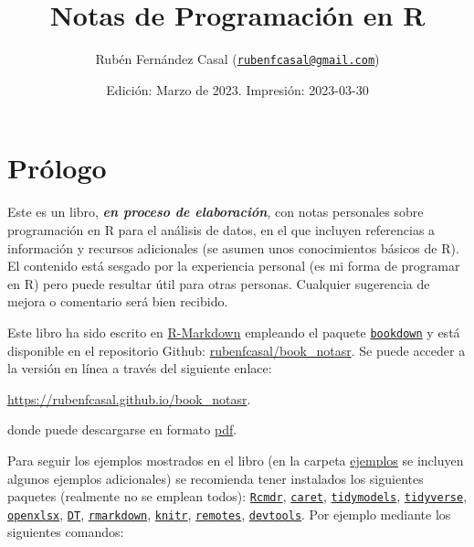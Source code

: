 \documentclass[
]{book}
\title{Notas de Programación en R}
\author{Rubén Fernández Casal (\href{mailto:rubenfcasal@gmail.com}{\nolinkurl{rubenfcasal@gmail.com}})}
\date{Edición: Marzo de 2023. Impresión: 2023-03-30}
\theoremstyle{break}
\theoremstyle{nonumberplain}
\begin{document}
\maketitle

{
\setcounter{tocdepth}{1}
\tableofcontents
}
\hypertarget{pruxf3logo}{%
\chapter*{Prólogo}\label{pruxf3logo}}

Este es un libro, \textbf{\emph{en proceso de elaboración}}, con notas personales sobre programación en R para el análisis de datos, en el que incluyen referencias a información y recursos adicionales (se asumen unos conocimientos básicos de R).
El contenido está sesgado por la experiencia personal (es mi forma de programar en R) pero puede resultar útil para otras personas.
Cualquier sugerencia de mejora o comentario será bien recibido.

Este libro ha sido escrito en \href{http://rmarkdown.rstudio.com}{R-Markdown} empleando el paquete \href{https://bookdown.org/yihui/bookdown/}{\texttt{bookdown}} y está disponible en el repositorio Github: \href{https://github.com/rubenfcasal/book_notasr}{rubenfcasal/book\_notasr}.
Se puede acceder a la versión en línea a través del siguiente enlace:

\url{https://rubenfcasal.github.io/book_notasr}.

donde puede descargarse en formato \href{https://rubenfcasal.github.io/book_notasr/Notas_R.pdf}{pdf}.

Para seguir los ejemplos mostrados en el libro (en la carpeta \href{https://github.com/rubenfcasal/book_notasr/tree/main/ejemplos}{ejemplos} se incluyen algunos ejemplos adicionales) se recomienda tener instalados los siguientes paquetes (realmente no se emplean todos):
\href{https://www.r-project.org}{\texttt{Rcmdr}}, \href{https://github.com/topepo/caret/}{\texttt{caret}}, \href{https://tidymodels.tidymodels.org}{\texttt{tidymodels}}, \href{https://tidyverse.tidyverse.org}{\texttt{tidyverse}}, \href{https://ycphs.github.io/openxlsx/index.html}{\texttt{openxlsx}}, \href{https://github.com/rstudio/DT}{\texttt{DT}}, \href{https://github.com/rstudio/rmarkdown}{\texttt{rmarkdown}}, \href{https://yihui.org/knitr/}{\texttt{knitr}}, \href{https://remotes.r-lib.org}{\texttt{remotes}}, \href{https://devtools.r-lib.org/}{\texttt{devtools}}.
Por ejemplo mediante los siguientes comandos:
\end{document}
